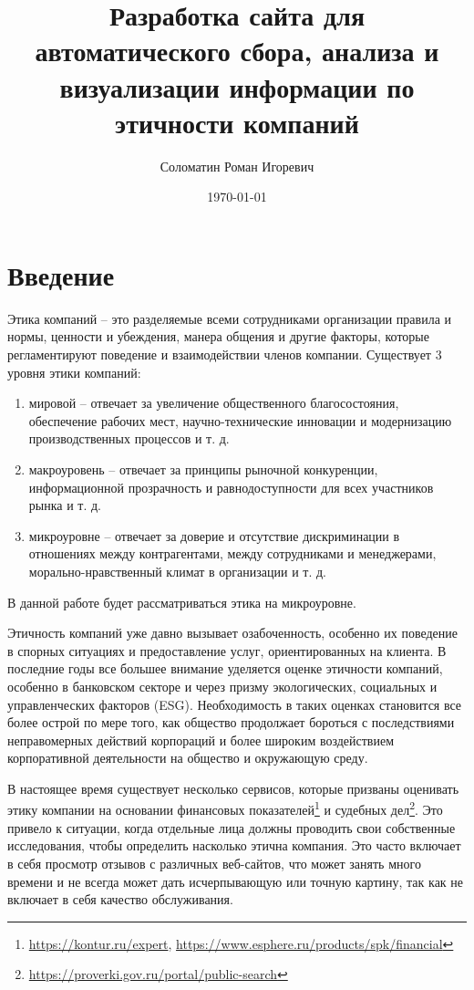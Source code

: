 \documentclass[PI, VKR]{HSEUniversity}
\author{Соломатин Роман Игоревич}
\date{\today}
\title{Разработка сайта для автоматического сбора, анализа и визуализации информации по этичности компаний}
\begin{document}
\maketitle

\chapter*{Введение}
\label{sec:org5282286}
Этика компаний – это разделяемые всеми сотрудниками организации правила и нормы, ценности и убеждения, манера общения и другие факторы, которые регламентируют поведение и взаимодействии членов компании. Существует 3 уровня этики компаний\autocite{smirnova_biznesetika_2021}:
\begin{enumerate}
\item мировой -- отвечает за увеличение общественного благосостояния, обеспечение рабочих мест, научно-технические инновации и модернизацию производственных процессов и т. д.
\item макроуровень -- отвечает за принципы рыночной конкуренции, информационной прозрачность и равнодоступности для всех участников рынка и т. д.
\item микроуровне -- отвечает за доверие и отсутствие дискриминации в отношениях между контрагентами, между сотрудниками и менеджерами, морально-нравственный климат в организации и т. д.
\end{enumerate}
В данной работе будет рассматриваться этика на микроуровне.

Этичность компаний уже давно вызывает озабоченность, особенно их поведение в спорных ситуациях и предоставление услуг, ориентированных на клиента. В последние годы все большее внимание уделяется оценке этичности компаний\autocites{mure_esg_2021}[][]{semenko_korporativnaya_2022}[][]{kudryavceva_korporativnosocialnaya_2016}, особенно в банковском секторе и через призму экологических, социальных и управленческих факторов (ESG). Необходимость в таких оценках становится все более острой по мере того, как общество продолжает бороться с последствиями неправомерных действий корпораций и более широким воздействием корпоративной деятельности на общество и окружающую среду.

В настоящее время существует несколько сервисов, которые призваны оценивать этику компании на основании финансовых показателей\footnote{\url{https://kontur.ru/expert}, \url{https://www.esphere.ru/products/spk/financial}} и судебных дел\footnote{\url{https://proverki.gov.ru/portal/public-search}}. Это привело к ситуации, когда отдельные лица должны проводить свои собственные исследования, чтобы определить насколько этична компания. Это часто включает в себя просмотр отзывов с различных веб-сайтов, что может занять много времени и не всегда может дать исчерпывающую или точную картину, так как не включает в себя качество обслуживания.
\end{document}
